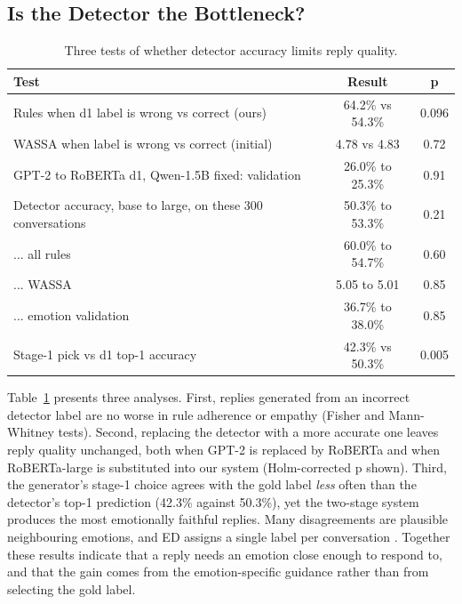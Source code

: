 \documentclass[conference,a4paper]{IEEEtran}
\begin{document}
\subsection{Is the Detector the Bottleneck?}
\begin{table}[htbp]
\caption{Three tests of whether detector accuracy limits reply quality.}
\label{tab:bottleneck}
\begin{center}
\scriptsize
\begin{tabular}{|l|c|c|}
\hline
\textbf{Test} & \textbf{Result} & \textbf{p} \\
\hline
Rules when d1 label is wrong vs correct (ours) & 64.2\% vs 54.3\% & 0.096 \\
\hline
WASSA when label is wrong vs correct (initial) & 4.78 vs 4.83 & 0.72 \\
\hline
GPT-2 to RoBERTa d1, Qwen-1.5B fixed: validation & 26.0\% to 25.3\% & 0.91 \\
\hline
Detector accuracy, base to large, on these 300 conversations & 50.3\% to 53.3\% & 0.21 \\
\hline
... all rules & 60.0\% to 54.7\% & 0.60 \\
\hline
... WASSA & 5.05 to 5.01 & 0.85 \\
\hline
... emotion validation & 36.7\% to 38.0\% & 0.85 \\
\hline
Stage-1 pick vs d1 top-1 accuracy & 42.3\% vs 50.3\% & 0.005 \\
\hline
\end{tabular}
\end{center}
\end{table}

Table~\ref{tab:bottleneck} presents three analyses. First, replies generated from an incorrect detector label are no worse in rule adherence or empathy (Fisher and Mann-Whitney tests). Second, replacing the detector with a more accurate one leaves reply quality unchanged, both when GPT-2 is replaced by RoBERTa and when RoBERTa-large is substituted into our system (Holm-corrected p shown). Third, the generator's stage-1 choice agrees with the gold label \emph{less} often than the detector's top-1 prediction (42.3\% against 50.3\%), yet the two-stage system produces the most emotionally faithful replies. Many disagreements are plausible neighbouring emotions, and ED assigns a single label per conversation \cite{b1}. Together these results indicate that a reply needs an emotion close enough to respond to, and that the gain comes from the emotion-specific guidance rather than from selecting the gold label.
\end{document}

